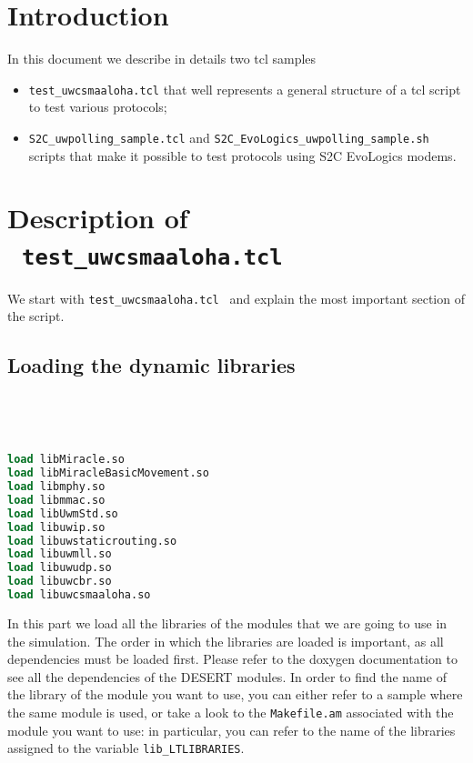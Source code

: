 \documentclass[11pt]{article}
\begin{document}

\begin{center}
    \begin{LARGE}  \end{LARGE}
\end{center}


\vspace{0.8cm}
\section{Introduction}
In this document we describe in details two tcl samples
\begin{itemize}
  \item{\tt test\_uwcsmaaloha.tcl} that well represents a general structure of a tcl script to test various protocols;
  \item{\tt S2C\_uwpolling\_sample.tcl} and {\tt S2C\_EvoLogics\_uwpolling\_sample.sh} scripts that make it possible to test protocols using S2C EvoLogics modems.
\end{itemize}



\section{Description of \ {\tt test\_uwcsmaaloha.tcl}}
\label{sec:uwcsmaaloha}

We start with {\tt test\_uwcsmaaloha.tcl } and explain the most important section of the script.



\subsection{Loading the dynamic libraries}
\ 
{\scriptsize\tt
\begin{lstlisting}[language=tcl]
load libMiracle.so
load libMiracleBasicMovement.so
load libmphy.so
load libmmac.so
load libUwmStd.so
load libuwip.so
load libuwstaticrouting.so
load libuwmll.so
load libuwudp.so
load libuwcbr.so
load libuwcsmaaloha.so
\end{lstlisting}
}

In this part we load all the libraries of the modules that we are going to use in the simulation. The order in which the libraries are loaded is important, as all dependencies must be loaded first. Please refer to the doxygen documentation to see all the dependencies of the DESERT modules. In order to find the name of the library of the module you want to use, you can either refer to a sample where the same module is used, or take a look to the {\tt Makefile.am} associated with the module you want to use: in particular, you can refer to the name of the libraries assigned to the variable {\tt lib\_LTLIBRARIES}.
\end{document}
